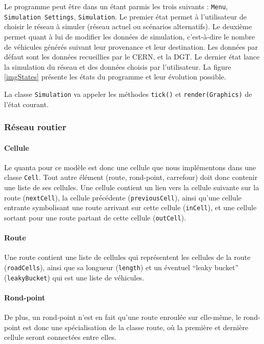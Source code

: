 \documentclass[a4paper,11pt, titlepage]{extarticle}
\begin{document}
Le programme peut être dans un étant parmis les trois suivants : \texttt{Menu}, \texttt{Simulation Settings}, \texttt{Simulation}. Le premier état permet à l'utilisateur de choisir le réseau à simuler (réseau actuel ou scénarios alternatifs). Le deuxième permet quant à lui de modifier les données de simulation, c'est-à-dire le nombre de véhicules générés suivant leur provenance et leur destination. Les données par défaut sont les données recueillies par le CERN, et la DGT. Le dernier état lance la simulation du réseau et des données choisis par l'utilisateur. La figure \ref{imgStates} présente les états du programme et leur évolution possible.

La classe \texttt{Simulation} va appeler les méthodes \texttt{tick()} et \texttt{render(Graphics)} de l'état courant.

\subsubsection{Réseau routier}

\paragraph{Cellule}

Le quanta pour ce modèle est donc une cellule que nous implémentons dans une classe \texttt{Cell}. Tout autre élément (route, rond-point, carrefour) doit donc contenir une liste de ses cellules. Une cellule contient un lien vers la cellule suivante sur la route (\texttt{nextCell}), la cellule précédente (\texttt{previousCell}), ainsi qu'une cellule entrante symbolisant une route arrivant sur cette cellule (\texttt{inCell}), et une cellule sortant pour une route partant de cette cellule (\texttt{outCell}).

\paragraph{Route}

Une route contient une liste de cellules qui représentent les cellules de la route (\texttt{roadCells}), ainsi que sa longueur (\texttt{length}) et un éventuel ``leaky bucket'' (\texttt{leakyBucket}) qui est une liste de véhicules.

\paragraph{Rond-point}

De plus, un rond-point n'est en fait qu'une route enroulée sur elle-même, le rond-point est donc une spécialisation de la classe route, où la première et dernière cellule seront connectées entre elles.
\end{document}
